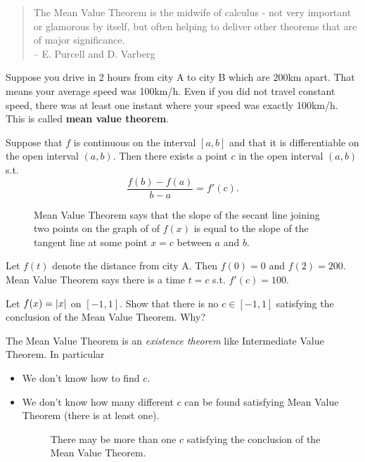 \documentclass[calc1-main.tex]{subfiles}
\begin{document}
\begin{quotation}
  The Mean Value Theorem is the midwife of calculus - not very important or glamorous by itself, but often helping to deliver other theorems that are of major significance.\\ – E. Purcell and D. Varberg
\end{quotation}

  Suppose you drive in 2 hours from city A to city B which are 200km apart. That means your average speed was 100km/h. Even if you did not travel constant speed, there was at least one instant where  your speed was exactly 100km/h. This is called \textbf{mean value theorem}.

  \begin{minipage}{0.5\textwidth}
    \begin{theorem}
      Suppose that $f$ is continuous on the interval $[a, b]$ and that it is differentiable on the open interval $(a, b)$. Then there exists a point $c$ in the open interval $(a, b)$ s.t.
      \[
        \frac{f(b) - f(a)}{b - a} = f'(c).
      \]
    \end{theorem}
  \end{minipage}%
  \begin{minipage}{0.5\textwidth}
    \begin{figure}[H]
      \centering
      
      \caption{Mean Value Theorem says that the slope of the secant line joining two points on the graph of of $f(x)$ is equal to the slope of the tangent line at some point $x=c$ between $a$ and $b$.}
    \end{figure}
  \end{minipage}

  Let $f(t)$ denote the distance from city A. Then $f(0) = 0$ and $f(2) = 200$. Mean Value Theorem says there is a time $t = c$ s.t. $f'(c) = 100$.

  \begin{example}
    Let $f(x) = \left\lvert x \right\rvert$ on $[-1, 1]$. Show that there is no $c \in [-1, 1]$ satisfying the conclusion of the Mean Value Theorem. Why?
  \end{example}

  The Mean Value Theorem is an \textit{existence theorem} like Intermediate Value Theorem. In particular
  \begin{itemize}
    \item We don't know how to find $c$.
    \item We don't know how many different $c$ can be found satisfying Mean Value Theorem (there is at least one).
    \begin{figure}[H]
      \centering
      
      \caption{There may be more than one $c$ satisfying the conclusion of the Mean Value Theorem.}
    \end{figure}
  \end{itemize}
\end{document}
